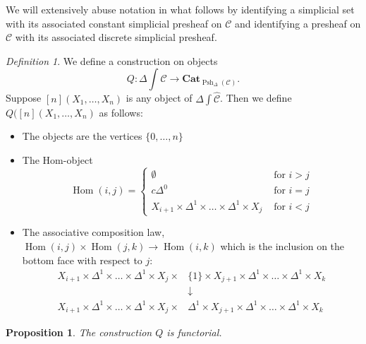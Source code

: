\documentclass[leqno]{article}
\numberwithin{equation}{subsection}
\theoremstyle{plain}   %
\newtheorem{prop}[equation]{Proposition}
\theoremstyle{remark}
\newtheorem{defn}[equation]{Definition}
\theoremstyle{plain}
\newcommand{\Cat}{\ensuremath{\mathbf{Cat}}}
\DeclareMathOperator{\Hom}{Hom}
\newcommand{\psh}[1]{\ensuremath{\widehat{#1}}}
\renewcommand{\C}{\ensuremath{\mathcal{C}}}
\newcommand{\spsh}{\ensuremath{\operatorname{Psh}_\Delta(\mathcal{C})}}
\begin{document}
We will extensively abuse notation in what follows by identifying a simplicial set with its associated constant simplicial presheaf on \(\C\) and identifying a presheaf on \(\C\) with its associated discrete simplicial presheaf.
\begin{defn}
	We define a construction on objects \[Q:\Delta\int\psh{\C}\to \Cat_{\spsh}.\] Suppose \([n](X_1,\dots, X_n)\) is any object of \(\Delta\int\psh{\C}\). Then we define \(Q([n](X_1,\dots,X_n)\) as follows:
	\begin{itemize}
		\item The objects are the vertices \(\{0,\dots,n\}\)
		\item The Hom-object
		      \[\Hom(i,j)=
			      \begin{cases}
				      \emptyset                                                & \text{ for } i>j \\
				      c\Delta^0                                                & \text{ for } i=j \\
				      X_{i+1} \times \Delta^1 \times \dots \times \Delta^1 \times X_j & \text{ for } i<j
			      \end{cases}
		      \]
		\item The associative composition law, \(\Hom(i,j)\times \Hom(j,k)\to \Hom(i,k)\) which is the inclusion on the bottom face with respect to \(j\):
		      \begin{align*}
			      X_{i+1}\times \Delta^1\times\dots\times\Delta^1\times X_j \times & \{1\}\times X_{j+1} \times \Delta^1\times\dots\times\Delta^1\times X_k    \\
			                                                                       & \downarrow                                                                \\
			      X_{i+1}\times \Delta^1\times\dots\times\Delta^1\times X_j\times  & \Delta^1\times X_{j+1} \times \Delta^1\times\dots\times\Delta^1\times X_k
		      \end{align*}
	\end{itemize}
\end{defn}
\begin{prop} The construction \(Q\) is functorial.
\end{prop}
\end{document}
